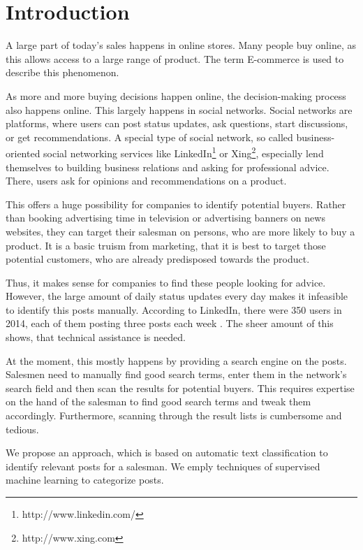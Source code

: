 
\section{Introduction}
\label{sec:introduction}

A large part of today's sales  happens in online stores.
Many people buy online, as this allows access to a large range of product.
The term E-commerce is used to describe this phenomenon.

As more and more buying decisions happen online, the decision-making process also happens online.
This largely happens in social networks.
Social networks are platforms, where users can post status updates, ask questions, start discussions, or get recommendations.
A special type of social network, so called business-oriented social networking services like LinkedIn\footnote{http://www.linkedin.com/} or Xing\footnote{http://www.xing.com}, especially lend themselves to building business relations and asking for professional advice.
There, users ask for opinions and recommendations on a product.

This offers a huge possibility for companies to identify potential buyers.
Rather than booking advertising time in television or advertising banners on news websites, they can target their salesman on persons, who are more likely to buy a product.
It is a basic truism from marketing, that it is best to target those potential customers, who are already predisposed towards the product. 

Thus, it makes sense for companies to find these people looking for advice.
However, the large amount of daily status updates every day makes it infeasible to identify this posts manually.
According to LinkedIn, there were 350 users in 2014, each of them posting three posts each week .
The sheer amount of this shows, that technical assistance is needed.

At the moment, this mostly happens by providing a search engine on the posts.
Salesmen need to manually find good search terms, enter them in the network's search field and then scan the results for potential buyers.
This requires expertise on the hand of the salesman to find good search terms and tweak them accordingly.
Furthermore, scanning through the result lists is cumbersome and tedious.

We propose an approach, which is based on automatic text classification to identify relevant posts for a salesman.
We emply techniques of supervised machine learning to categorize posts.

